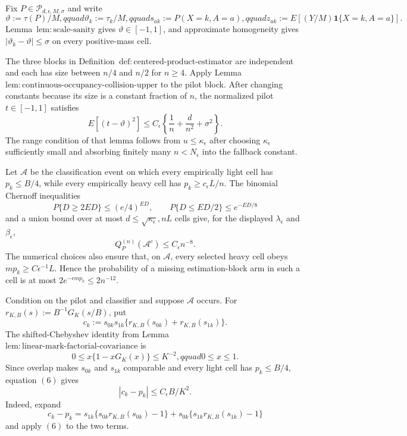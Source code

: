 Fix \(P\in\mathcal P_{d,\epsilon,M,\sigma}\) and write
\[
 \vartheta:=\tau(P)/M,qquad
 \vartheta_k:=\tau_k/M,qquad
 s_{ak}:=P(X=k,A=a),qquad
 z_{ak}:=E[(Y/M)\mathbf 1\{X=k,A=a\}].
\tag{1}
\]
Lemma~\(\mathrm{lem:scale\text{-}sanity}\) gives \(\vartheta\in[-1,1]\), and approximate homogeneity gives \(|\vartheta_k-\vartheta|\le\sigma\) on every positive-mass cell.

The three blocks in Definition~\(\mathrm{def:centered\text{-}product\text{-}estimator}\) are independent and each has size between \(n/4\) and \(n/2\) for \(n\ge4\).  Apply Lemma~\(\mathrm{lem:continuous\text{-}occupancy\text{-}collision\text{-}upper}\) to the pilot block.  After changing constants because its size is a constant fraction of \(n\), the normalized pilot \(t\in[-1,1]\) satisfies
\[
 E[(t-\vartheta)^2]
 \le C_{\epsilon}\left\{\frac1n+\frac d{n^2}+\sigma^2\right\}.
\tag{2}
\]
The range condition of that lemma follows from \(u\le\kappa_{\epsilon}\) after choosing \(\kappa_{\epsilon}\) sufficiently small and absorbing finitely many \(n<N_{\epsilon}\) into the fallback constant.

Let \(\mathcal A\) be the classification event on which every empirically light cell has \(p_k\le B/4\), while every empirically heavy cell has \(p_k\ge c_{\epsilon}L/n\).  The binomial Chernoff inequalities
\[
 P\{D\ge2E D\}\le(e/4)^{E D},
 \qquad
 P\{D\le E D/2\}\le e^{-E D/8}
\tag{3}
\]
and a union bound over at most \(d\le\sqrt{\kappa_{\epsilon}},nL\) cells give, for the displayed \(\lambda_{\epsilon}\) and \(\beta_{\epsilon}\),
\[
 Q_P^{(n)}(\mathcal A^c)\le C_{\epsilon}n^{-8}.
\tag{4}
\]
The numerical choices also ensure that, on \(\mathcal A\), every selected heavy cell obeys \(mp_k\ge C\epsilon^{-1}L\).  Hence the probability of a missing estimation-block arm in such a cell is at most \(2e^{-\epsilon mp_k}\le2n^{-12}\).

Condition on the pilot and classifier and suppose \(\mathcal A\) occurs.  For \(r_{K,B}(s):=B^{-1}G_K(s/B)\), put
\[
 c_k:=s_{0k}s_{1k}\{r_{K,B}(s_{0k})+r_{K,B}(s_{1k})\}.
\tag{5}
\]
The shifted-Chebyshev identity from Lemma~\(\mathrm{lem:linear\text{-}mark\text{-}factorial\text{-}covariance}\) is
\[
 0\le x\{1-xG_K(x)\}\le K^{-2},qquad 0\le x\le1.
\tag{6}
\]
Since overlap makes \(s_{0k}\) and \(s_{1k}\) comparable and every light cell has \(p_k\le B/4\), equation \((6)\) gives
\[
 |c_k-p_k|
 \le C_{\epsilon}B/K^2.
\tag{7}
\]
Indeed, expand
\[
 c_k-p_k=s_{1k}\{s_{0k}r_{K,B}(s_{0k})-1\}
 +s_{0k}\{s_{1k}r_{K,B}(s_{1k})-1\}
\]
and apply \((6)\) to the two terms.

